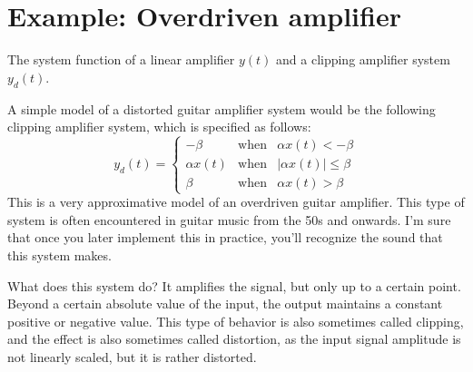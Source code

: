 \section{Example: Overdriven amplifier}
\begin{marginfigure}
\caption{The system function of a linear amplifier $y(t)$ and a clipping amplifier system $y_d(t)$.}
\label{dist_effect}
\end{marginfigure}

A simple model of a distorted guitar amplifier system would be the
following clipping amplifier system, which is specified as follows:
\begin{equation}
y_d(t) = \left\{
  \begin{array}{rcr}
    -\beta & \mathrm{when} & \alpha x(t)<-\beta \\
    \alpha x(t) & \mathrm{when} & |\alpha x(t)| \le \beta \\
    \beta & \mathrm{when} & \alpha x(t)>\beta 
\end{array}
\right.
\label{clipamp}
\end{equation}
This is a very approximative model of an overdriven guitar
amplifier. This type of system is often encountered in guitar music from the 50s and onwards. I'm sure that once you later implement this in practice, you'll recognize the sound that this system makes.

What does this system do? It amplifies the signal, but only up to a certain point. Beyond a certain absolute value of the input, the output maintains a constant positive or negative value.  This type of behavior is also sometimes called clipping, and the effect is
also sometimes called distortion, as the input signal amplitude is not linearly scaled, but it is rather distorted.

